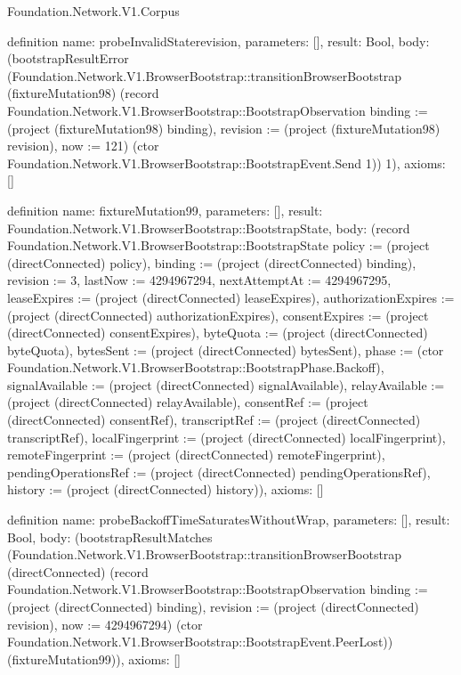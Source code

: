\begin{lexlean}{Foundation.Network.V1.Corpus}
\begin{semanticmodule}
definition{
  name: probeInvalidStaterevision,
  parameters: [],
  result: Bool,
  body: (bootstrapResultError (Foundation.Network.V1.BrowserBootstrap::transitionBrowserBootstrap (fixtureMutation98) (record Foundation.Network.V1.BrowserBootstrap::BootstrapObservation {binding := (project (fixtureMutation98) binding), revision := (project (fixtureMutation98) revision), now := 121}) (ctor Foundation.Network.V1.BrowserBootstrap::BootstrapEvent.Send 1)) 1),
  axioms: []
}

definition{
  name: fixtureMutation99,
  parameters: [],
  result: Foundation.Network.V1.BrowserBootstrap::BootstrapState,
  body: (record Foundation.Network.V1.BrowserBootstrap::BootstrapState {policy := (project (directConnected) policy), binding := (project (directConnected) binding), revision := 3, lastNow := 4294967294, nextAttemptAt := 4294967295, leaseExpires := (project (directConnected) leaseExpires), authorizationExpires := (project (directConnected) authorizationExpires), consentExpires := (project (directConnected) consentExpires), byteQuota := (project (directConnected) byteQuota), bytesSent := (project (directConnected) bytesSent), phase := (ctor Foundation.Network.V1.BrowserBootstrap::BootstrapPhase.Backoff), signalAvailable := (project (directConnected) signalAvailable), relayAvailable := (project (directConnected) relayAvailable), consentRef := (project (directConnected) consentRef), transcriptRef := (project (directConnected) transcriptRef), localFingerprint := (project (directConnected) localFingerprint), remoteFingerprint := (project (directConnected) remoteFingerprint), pendingOperationsRef := (project (directConnected) pendingOperationsRef), history := (project (directConnected) history)}),
  axioms: []
}

definition{
  name: probeBackoffTimeSaturatesWithoutWrap,
  parameters: [],
  result: Bool,
  body: (bootstrapResultMatches (Foundation.Network.V1.BrowserBootstrap::transitionBrowserBootstrap (directConnected) (record Foundation.Network.V1.BrowserBootstrap::BootstrapObservation {binding := (project (directConnected) binding), revision := (project (directConnected) revision), now := 4294967294}) (ctor Foundation.Network.V1.BrowserBootstrap::BootstrapEvent.PeerLost)) (fixtureMutation99)),
  axioms: []
}


\end{semanticmodule}
\end{lexlean}
